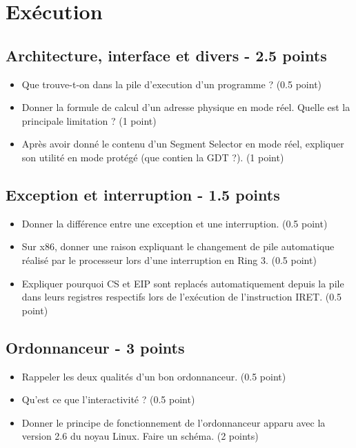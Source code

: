 \section{Ex\'ecution
         {\hfill{} }}

\subsection{Architecture, interface et divers - 2.5 points}
\begin{itemize}
\item Que trouve-t-on dans la pile d'execution d'un programme ? (0.5 point)
\item Donner la formule de calcul d'un adresse physique en mode r\'eel. Quelle est la principale limitation ?  (1 point)
\item Apr\`es avoir donn\'e le contenu d'un Segment Selector en mode r\'eel, expliquer son utilit\'e en mode prot\'eg\'e (que contien la GDT ?).  (1 point)
\end{itemize}

\subsection{Exception et interruption -  1.5 points}
 \begin{itemize}
\item Donner la diff\'erence entre une exception et une interruption. (0.5 point)
\item Sur x86, donner une raison expliquant le changement de pile automatique r\'ealis\'e par le processeur lors d'une interruption en Ring 3. (0.5 point)
\item Expliquer pourquoi CS et EIP sont replac\'es automatiquement depuis la pile dans leurs registres respectifs lors de l'ex\'ecution de l'instruction IRET. (0.5 point)
\end{itemize}

\subsection{Ordonnanceur - 3 points}
 \begin{itemize}
\item Rappeler les deux qualit\'es d'un bon ordonnanceur. (0.5 point)
\item Qu'est ce que l'interactivit\'e ? (0.5 point)
\item Donner le principe de fonctionnement de l'ordonnanceur apparu avec la version 2.6 du noyau Linux. Faire un sch\'ema. (2 points)
\end{itemize}

